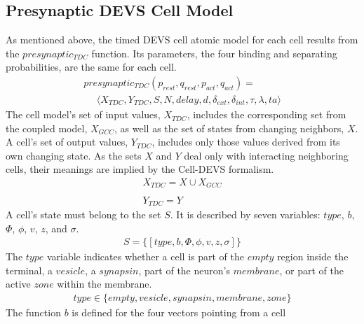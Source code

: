 \documentclass{acm_proc_article-sp}
\begin{document}
\subsection{Presynaptic DEVS Cell Model} \label{Cell_Model}
As mentioned above, the timed DEVS cell atomic model for each cell 
results from the
$presynaptic_{TDC}$ function.  Its parameters, the four binding and 
separating probabilities, are the same for each cell.
\begin{displaymath} \begin{array}{l}
presynaptic_{TDC}(p_{rest}, q_{rest}, p_{act}, q_{act}) = \\
\hspace{16pt} \langle X_{TDC}, Y_{TDC}, S, N, delay, d, \delta_{ext}, \delta_{int}, \tau, \lambda, ta \rangle 
\end{array} \end{displaymath}
The cell model's set of input values, $X_{TDC}$, includes the corresponding 
set from the coupled model, $X_{GCC}$, as well as the set of states 
from changing neighbors, $X$.  A cell's set of output values, $Y_{TDC}$, 
includes only those values derived from its own changing state.  As the sets 
$X$ and $Y$ deal only with interacting neighboring cells, their meanings are 
implied by the Cell-DEVS formalism.
\begin{displaymath} \begin{array}{l}
X_{TDC} = X \cup X_{GCC} \\
\\
Y_{TDC} = Y
\end{array} \end{displaymath}
A cell's state must belong to the set $S$.  It is described by seven
variables: $type$, $b$, $\Phi$, $\phi$, $v$, $z$, and $\sigma$.
\begin{displaymath} \begin{array}{l}
S = \{ [type, b, \Phi, \phi, v, z, \sigma]\}
\end{array} \end{displaymath}
The $type$ variable indicates whether a cell is part of the $empty$
region inside the terminal, a $vesicle$, a $synapsin$, part of the
neuron's $membrane$, or part of the active $zone$ within the membrane.
\begin{displaymath} \begin{array}{l}
type \in \{empty, vesicle, synapsin, membrane, zone\}
\end{array} \end{displaymath}
The function $b$ is defined for the four vectors pointing from a cell
\end{document}
